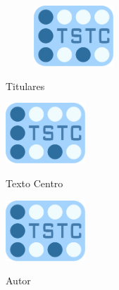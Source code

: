 \documentclass[a4paper,openright]{memoir}
\begin{document}
	\begin{center}
		
		\vspace{2cm}
		
		\begin{figure}[h]
			\centering
				\includegraphics[width=3cm]
				{fig/LogoTSTC.pdf}
		\end{figure}
		
		\vfill

		{\LARGE Titulares}\\[4cm]


		\begin{minipage}{.3\textwidth}
			\begin{center}
				\includegraphics[width=3cm]
				{fig/LogoTSTC.pdf}
			\end{center}
		\end{minipage}
		\begin{minipage}{.3\textwidth}
			\begin{center}
				\vfill
				Texto Centro
				\vfill
			\end{center}
		\end{minipage}
		\begin{minipage}{.3\textwidth}
			\begin{center}
				\includegraphics[width=3cm]
				{fig/LogoTSTC.pdf}
			\end{center}
		\end{minipage}
		
		\vfill
		
		{\LARGE Autor}

		\vspace{4cm}

		
	\end{center}
\end{document}

